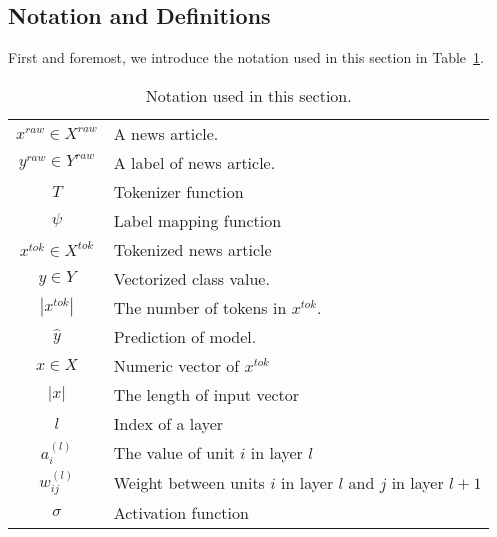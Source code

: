 \subsection{Notation and Definitions}
\label{subsec:newsContentModels_Definitions}
First and foremost, we introduce the notation used in this section in Table~\ref{tab:newsContentModels_Notation}.\\
\begin{table}
    \centering
    \def\arraystretch{1.5}
    \begin{tabular}{cp{}}
        $x^{raw} \in X^{raw}$ & A news article.                                              \\
        $y^{raw} \in Y^{raw}$ & A label of news article.                                     \\
        $T$                   & Tokenizer function                                           \\
        $\psi$                & Label mapping function                                       \\
        $x^{tok} \in X^{tok}$ & Tokenized news article                                       \\
        $y \in Y$             & Vectorized class value.                                      \\
        $|x^{tok}|$           & The number of tokens in $x^{tok}$.                           \\
        $\hat{y}$             & Prediction of model.                                         \\
        $x \in X$             & Numeric vector of $x^{tok}$                                  \\
        $|x|$                 & The length of input vector                                   \\
        $l$                   & Index of a layer                                             \\
        $a_{i}^{(l)}$         & The value of unit $i$ in layer $l$                           \\
        $w_{ij}^{(l)}$        & Weight between units $i$ in layer $l$ and $j$ in layer $l+1$ \\
        $\sigma$              & Activation function                                          \\
    \end{tabular}
    \caption[Notation]{Notation used in this section.}
    \label{tab:newsContentModels_Notation}
\end{table}
